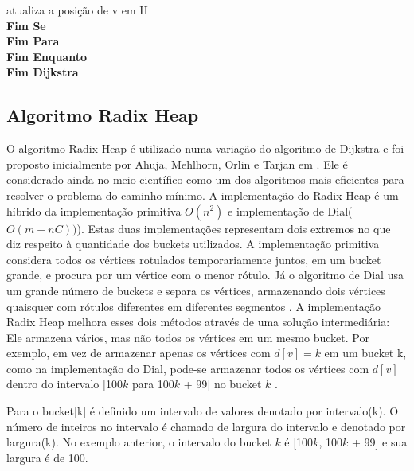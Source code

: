 {\begin{minipage}{70ex}
\vspace*{-1mm} \phantom{} \hspace{12ex} atualiza a posição de v em H\\
\vspace*{-1mm} \phantom{} \hspace{9ex} {\bf Fim Se}\\
\vspace*{-1mm} \phantom{} \hspace{6ex} {\bf Fim Para}\\
\vspace*{-1mm} \phantom{} \hspace{3ex} {\bf Fim Enquanto}\\
\vspace*{-1mm} \phantom{} \hspace{0ex} {\bf Fim Dijkstra}\\
\end{minipage}}

\subsection{Algoritmo Radix Heap}
O algoritmo Radix Heap é utilizado numa variação do algoritmo de Dijkstra e foi proposto inicialmente por
Ahuja, Mehlhorn, Orlin e Tarjan em \cite{ahuja}.
Ele é considerado ainda no meio científico como um dos algoritmos mais eficientes para resolver o
problema do caminho mínimo.
A implementação do Radix Heap é um híbrido da implementação primitiva $O(n^2)$ e implementação de Dial($O(m + nC))$). 
Estas duas implementações representam dois extremos no que diz respeito à quantidade dos buckets utilizados.
A implementação primitiva considera todos os vértices rotulados temporariamente juntos, em um bucket grande,
e procura por um vértice com o menor rótulo. Já o algoritmo de Dial usa um grande número de buckets e separa os vértices,
armazenando dois vértices quaisquer com rótulos diferentes em diferentes segmentos \cite{bookahuja}.
A implementação Radix Heap melhora esses dois métodos através de uma solução intermediária:
Ele armazena vários, mas não todos os vértices em um mesmo bucket. Por exemplo, em vez de armazenar
apenas os vértices com $d[v] = k$ em um bucket k, como na implementação do Dial,
pode-se armazenar todos os vértices com $d[v]$ dentro do intervalo [100$k$ para 100$k$ + 99] no bucket $k$ \cite{bookahuja}.

Para o bucket[k] é definido um intervalo de valores denotado por intervalo(k). O número de inteiros
no intervalo é chamado de largura do intervalo e denotado por largura(k).
No exemplo anterior, o intervalo do bucket $k$ é [100$k$, 100$k$ + 99] e sua largura é de 100. 

